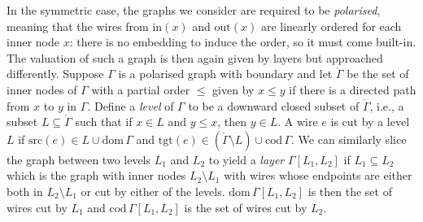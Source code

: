 
In the symmetric case, the graphs we consider are required to be \emph{polarised}, meaning that the wires from $\mathrm{in}(x)$ and $\mathrm{out}(x)$ are linearly ordered for each inner node $x$: there is no embedding to induce the order, so it must come built-in.
The valuation of such a graph is then again given by layers but approached differently.
Suppose $\Gamma$ is a polarised graph with boundary and let $\mathring{\Gamma}$ be the set of inner nodes of $\Gamma$ with a partial order $\leq$ given by $x \leq y$ if there is a directed path from $x$ to $y$ in $\Gamma$.
Define a \emph{level} of $\Gamma$ to be a downward closed subset of $\mathring{\Gamma}$, i.e., a subset $L \subseteq \mathring{\Gamma}$ such that if $x \in L$ and $y \leq x$, then $y \in L$.
A wire $e$ is cut by a level $L$ if $\mathrm{src}(e) \in L \cup \mathrm{dom}\,\Gamma$ and $\mathrm{tgt}(e) \in (\mathring{\Gamma} \setminus L) \cup \mathrm{cod}\,\Gamma$.
We can similarly slice the graph between two levels $L_1$ and $L_2$ to yield a \emph{layer} $\Gamma[L_1, L_2]$ if $L_1 \subseteq L_2$ which is the graph with inner nodes $L_2 \setminus L_1$ with wires whose endpoints are either both in $L_2 \setminus L_1$ or cut by either of the levels.
$\mathrm{dom}\,\Gamma[L_1, L_2]$ is then the set of wires cut by $L_1$ and $\mathrm{cod}\,\Gamma[L_1, L_2]$ is the set of wires cut by $L_2$.

